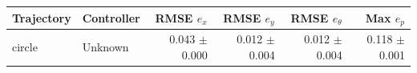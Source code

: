 \begin{tabular}{llrrrr}
\hline
Trajectory & Controller & RMSE $e_x$ & RMSE $e_y$ & RMSE $e_\theta$ & Max $e_p$ \\
\hline
circle & Unknown & 0.043 $\pm$ 0.000 & 0.012 $\pm$ 0.004 & 0.012 $\pm$ 0.004 & 0.118 $\pm$ 0.001 \\
\hline
\end{tabular}
